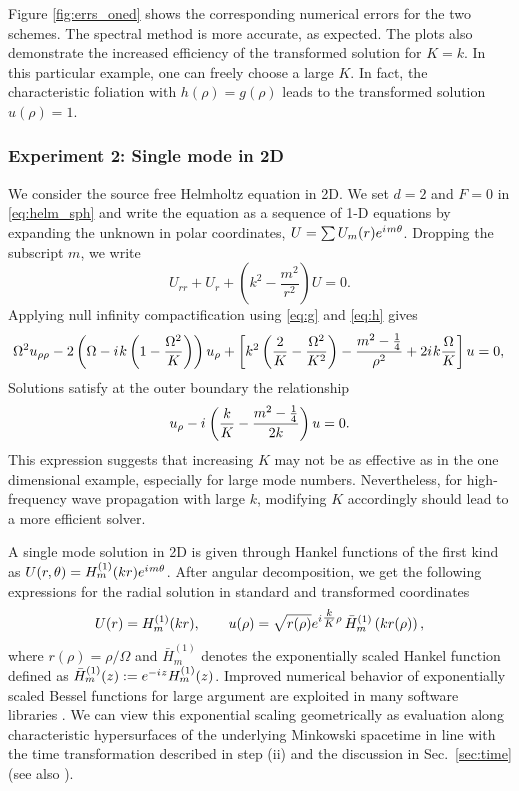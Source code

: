 \documentclass[draft,onefignum,onetabnum]{siamart190516}
\newcommand{\iu}{{i\mkern1mu}}
\begin{document}
Figure \ref{fig:errs_oned} shows the corresponding numerical errors for the two schemes. The spectral method is more accurate, as expected. The plots also demonstrate the increased efficiency of the transformed solution for $K=k$. In this particular example, one can freely choose a large $K$. In fact, the characteristic foliation with $h(\rho) =g(\rho)$ leads to the transformed solution $u(\rho)=1$. 

\subsubsection{Experiment 2: Single mode in 2D} 
We consider the source free Helmholtz equation in 2D. We set $d=2$ and $F=0$ in \eqref{eq:helm_sph} and write the equation as a sequence of 1-D equations by expanding the unknown in polar coordinates, $U=\sum U_m(r) e^{\iu m \theta}$. Dropping the subscript $m$, we write
\begin{equation}
	 U_{rr} + U_r + \left(k^2 - \frac{m^2}{r^2}\right)U = 0.
\end{equation}
Applying null infinity compactification using \eqref{eq:g} and \eqref{eq:h} gives 
\begin{equation}
\label{eq:hyp_2d}
	\Omega^2 u_{\rho\rho} - 2 \left(\Omega-\iu k \left(1-\frac{\Omega^2}{K}\right) \right) u_\rho + \left[k^2 \left(\frac{2}{K}-\frac{\Omega^2}{K^2}\right) - \frac{m^2-\tfrac{1}{4}}{\rho^2}  + 2 \iu k \frac{\Omega}{K} \right] u = 0,\\
\end{equation}
Solutions satisfy at the outer boundary the relationship
\[ u_\rho - \iu \left(\frac{k}{K} - \frac{m^2-\tfrac{1}{4}}{2k}\right)u = 0.  \]
This expression suggests that increasing $K$ may not be as effective as in the one dimensional example, especially for large mode numbers. Nevertheless, for high-frequency wave propagation with large $k$, modifying $K$ accordingly should lead to a more efficient solver.

A single mode solution in 2D is given through Hankel functions of the first kind as  $U(r, \theta) = H_m^{(1)}(k r) e^{\iu m \theta}$. After angular decomposition, we get the following expressions for the radial solution in standard and transformed coordinates
\begin{equation}\label{eq:hankel_soln}
	U(r) = H_m^{(1)}(k r), \qquad u(\rho) = \sqrt{r(\rho)} e^{\iu \tfrac{k}{K} \rho} \, \bar{H}_m^{(1)}\left(k r(\rho)\right),
\end{equation}
where $r(\rho)=\rho/\Omega$ and $\bar{H}_{m}^{(1)}$ denotes the exponentially scaled Hankel function defined as $\bar{H}_{m}^{(1)}(z) := e^{-\iu z} H_{m}^{(1)}(z)$. Improved numerical behavior of exponentially scaled Bessel functions for large argument are exploited in many software libraries \cite{amos1986algorithm, 2020SciPy-NMeth}. We can view this exponential scaling geometrically as evaluation along characteristic hypersurfaces of the underlying Minkowski spacetime in line with the time transformation described in step (ii) and the discussion in Sec.~\ref{sec:time} (see also \cite{ZengFramework}).
\end{document}
